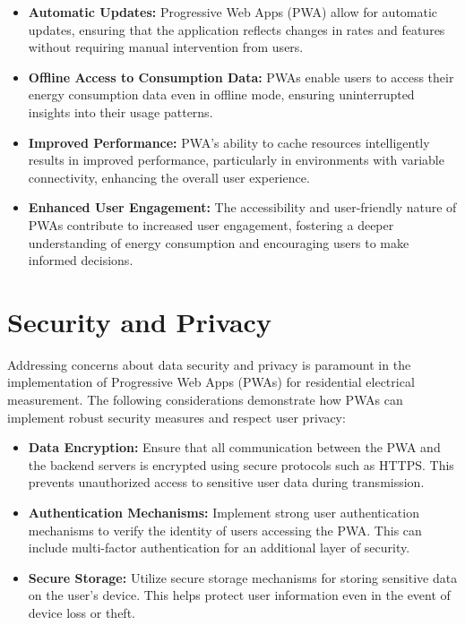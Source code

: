 \documentclass{article}
\begin{document}
\begin{multicols}{2}
\begin{itemize}
    \item \textbf{Automatic Updates:} Progressive Web Apps (PWA) allow for automatic updates, ensuring that the application reflects changes in rates and features without requiring manual intervention from users.
    
    \item \textbf{Offline Access to Consumption Data:} PWAs enable users to access their energy consumption data even in offline mode, ensuring uninterrupted insights into their usage patterns.
    
    \item \textbf{Improved Performance:} PWA's ability to cache resources intelligently results in improved performance, particularly in environments with variable connectivity, enhancing the overall user experience.
    
    \item \textbf{Enhanced User Engagement:} The accessibility and user-friendly nature of PWAs contribute to increased user engagement, fostering a deeper understanding of energy consumption and encouraging users to make informed decisions.
\end{itemize}





\section*{Security and Privacy}
Addressing concerns about data security and privacy is paramount in the implementation of Progressive Web Apps (PWAs) for residential electrical measurement. The following considerations demonstrate how PWAs can implement robust security measures and respect user privacy:

\begin{itemize}
    \item \textbf{Data Encryption:} Ensure that all communication between the PWA and the backend servers is encrypted using secure protocols such as HTTPS. This prevents unauthorized access to sensitive user data during transmission.

    \item \textbf{Authentication Mechanisms:} Implement strong user authentication mechanisms to verify the identity of users accessing the PWA. This can include multi-factor authentication for an additional layer of security.

    \item \textbf{Secure Storage:} Utilize secure storage mechanisms for storing sensitive data on the user's device. This helps protect user information even in the event of device loss or theft.


\end{itemize}
\end{multicols}
\end{document}
